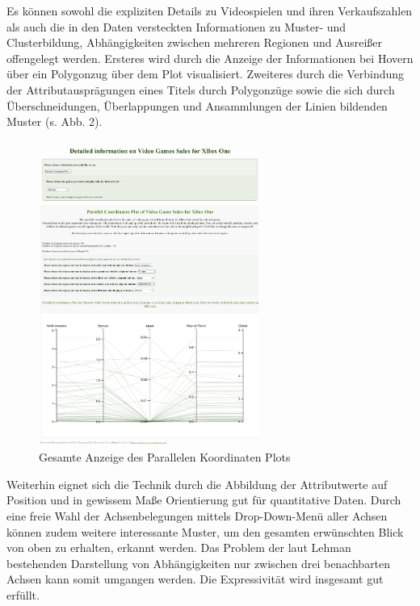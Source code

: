 \documentclass[usegeometry=true]{scrartcl}
\begin{document}
Es können sowohl die expliziten Details zu Videospielen und ihren Verkaufszahlen als auch die in den Daten versteckten Informationen zu Muster- und Clusterbildung, Abhängigkeiten zwischen mehreren Regionen und Ausreißer offengelegt werden.
Ersteres wird durch die Anzeige der Informationen bei Hovern über ein Polygonzug über dem Plot visualisiert. 
Zweiteres durch die Verbindung der Attributausprägungen eines Titels durch Polygonzüge sowie die sich durch Überschneidungen, Überlappungen und Ansammlungen der Linien bildenden Muster (s. Abb. 2). 
\begin{figure}[h]
        \centering
        \includegraphics[height=10cm]{Bilder/ParallelPlot_full.png}
        \caption{Gesamte Anzeige des Parallelen Koordinaten Plots}
        \label{fig:ParallelPlot}
\end{figure}
Weiterhin eignet sich die Technik durch die Abbildung der Attributwerte auf Position und in gewissem Maße Orientierung gut für quantitative Daten.\cite{Bertin.1982}
Durch eine freie Wahl der Achsenbelegungen mittels Drop-Down-Menü aller Achsen können zudem weitere interessante Muster, um den gesamten erwünschten Blick von oben zu erhalten, erkannt werden. 
Das Problem der laut Lehman bestehenden Darstellung von Abhängigkeiten nur zwischen drei benachbarten Achsen kann somit umgangen werden.\cite[594]{Lehmann.2010}
Die Expressivität wird insgesamt gut erfüllt.
\end{document}
